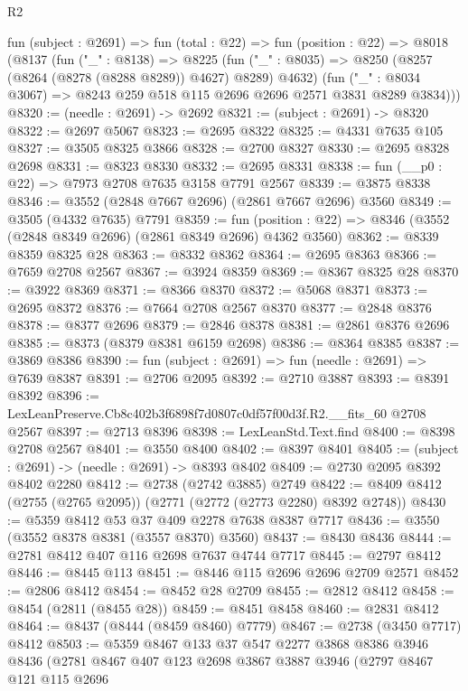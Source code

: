 \begin{lexlean}{R2}
\begin{coremodule}
  fun (subject : @2691) =>
  fun (total : @22) =>
  fun (position : @22) =>
  @8018
    (@8137
      (fun ("_" : @8138) =>
      @8225
        (fun ("_" : @8035) => @8250 (@8257 (@8264 (@8278 (@8288 @8289)) @4627) @8289) @4632)
        (fun ("_" : @8034 @3067) => @8243 @259 @518 @115 @2696 @2696 @2571 @3831 @8289 @3834)))
@8320 := (needle : @2691) -> @2692
@8321 := (subject : @2691) -> @8320
@8322 := @2697 @5067
@8323 := @2695 @8322
@8325 := @4331 @7635 @105
@8327 := @3505 @8325 @3866
@8328 := @2700 @8327
@8330 := @2695 @8328 @2698
@8331 := @8323 @8330
@8332 := @2695 @8331
@8338 := fun (__p0 : @22) => @7973 @2708 @7635 @3158 @7791 @2567
@8339 := @3875 @8338
@8346 := @3552 (@2848 @7667 @2696) (@2861 @7667 @2696) @3560
@8349 := @3505 (@4332 @7635) @7791
@8359 := fun (position : @22) => @8346 (@3552 (@2848 @8349 @2696) (@2861 @8349 @2696) @4362 @3560)
@8362 := @8339 @8359 @8325 @28
@8363 := @8332 @8362
@8364 := @2695 @8363
@8366 := @7659 @2708 @2567
@8367 := @3924 @8359
@8369 := @8367 @8325 @28
@8370 := @3922 @8369
@8371 := @8366 @8370
@8372 := @5068 @8371
@8373 := @2695 @8372
@8376 := @7664 @2708 @2567 @8370
@8377 := @2848 @8376
@8378 := @8377 @2696
@8379 := @2846 @8378
@8381 := @2861 @8376 @2696
@8385 := @8373 (@8379 @8381 @6159 @2698)
@8386 := @8364 @8385
@8387 := @3869 @8386
@8390 := fun (subject : @2691) => fun (needle : @2691) => @7639 @8387
@8391 := @2706 @2095
@8392 := @2710 @3887
@8393 := @8391 @8392
@8396 := LexLeanPreserve.Cb8c402b3f6898f7d0807c0df57f00d3f.R2.__fits_60 @2708 @2567
@8397 := @2713 @8396
@8398 := LexLeanStd.Text.find
@8400 := @8398 @2708 @2567
@8401 := @3550 @8400
@8402 := @8397 @8401
@8405 := (subject : @2691) -> (needle : @2691) -> @8393 @8402
@8409 := @2730 @2095 @8392 @8402 @2280
@8412 := @2738 (@2742 @3885) @2749
@8422 := @8409 @8412 (@2755 (@2765 @2095)) (@2771 (@2772 (@2773 @2280) @8392 @2748))
@8430 := @5359 @8412 @53 @37 @409 @2278 @7638 @8387 @7717
@8436 := @3550 (@3552 @8378 @8381 (@3557 @8370) @3560)
@8437 := @8430 @8436
@8444 := @2781 @8412 @407 @116 @2698 @7637 @4744 @7717
@8445 := @2797 @8412
@8446 := @8445 @113
@8451 := @8446 @115 @2696 @2696 @2709 @2571
@8452 := @2806 @8412
@8454 := @8452 @28 @2709
@8455 := @2812 @8412
@8458 := @8454 (@2811 (@8455 @28))
@8459 := @8451 @8458
@8460 := @2831 @8412
@8464 := @8437 (@8444 (@8459 @8460) @7779)
@8467 := @2738 (@3450 @7717) @8412
@8503 := @5359
    @8467
    @133
    @37
    @547
    @2277
    @3868
    @8386
    @3946
    @8436
    (@2781
      @8467
      @407
      @123
      @2698
      @3867
      @3887
      @3946
      (@2797
        @8467
        @121
        @115
        @2696

\end{coremodule}
\end{lexlean}
